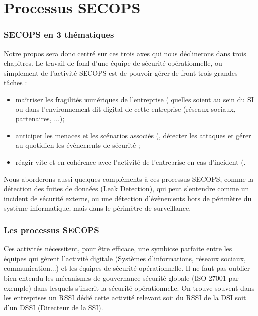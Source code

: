 \section{Processus SECOPS}


\begin{frame}
\frametitle<presentation>{SECOPS en 3 thématiques}
Notre propos sera donc centré sur ces trois axes  qui nous déclinerons dans trois chapitres. Le travail de fond d'une équipe de sécurité opérationnelle, ou simplement de l'activité SECOPS est de pouvoir gérer de front trois grandes tâches : 
\begin{itemize}
 \item maîtriser les fragilités numériques de l'entreprise ( quelles soient au sein du SI ou dans l'environnement dit digital de cette entreprise (réseaux sociaux, partenaires, ...);
 \item anticiper les menaces et les scénarios associés (, détecter les attaques et gérer au quotidien les événements de sécurité ;
 \item réagir vite et en cohérence avec l'activité de l'entreprise en cas d'incident (.
\end{itemize}
\end{frame}

Nous aborderons aussi quelques compléments à ces processus SECOPS, comme la détection des fuites de données (Leak Detection), qui peut s'entendre comme un incident de sécurité externe, ou une détection d'évènements hors de périmètre du système informatique, mais dans le périmètre de surveillance.

\begin{frame}
\frametitle<presentation>{Les processus SECOPS}

\end{frame}

Ces activités nécessitent, pour être efficace, une symbiose parfaite entre les équipes qui gèrent l'activité digitale (Systèmes d'informations, réseaux sociaux,  communication...) et les équipes de sécurité opérationnelle.
Il ne faut pas oublier bien entendu les mécanismes de gouvernance sécurité globale (ISO 27001 par exemple) dans lesquels s'inscrit la sécurité opérationnelle. On trouve souvent dans les entreprises un RSSI dédié cette activité relevant soit du RSSI de la DSI soit d'un DSSI (Directeur de la SSI).

